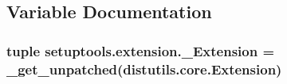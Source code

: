 \subsection{Variable Documentation}
\hypertarget{namespacesetuptools_1_1extension_a59f8a106752a29db3405d885a230572c}{}
\subsubsection[{\+\_\+\+Extension}]{\setlength{\rightskip}{0pt plus 5cm}tuple setuptools.\+extension.\+\_\+\+Extension = \+\_\+get\+\_\+unpatched(distutils.\+core.\+Extension)}\label{namespacesetuptools_1_1extension_a59f8a106752a29db3405d885a230572c}
